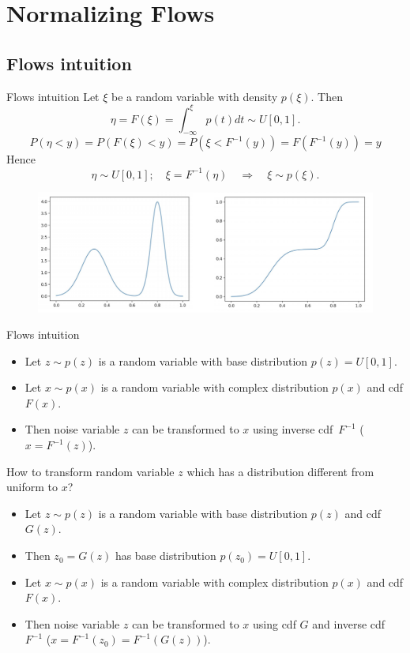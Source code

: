 \section{Normalizing Flows}
\subsection{Flows intuition}
\begin{frame}{Flows intuition}
	Let $\xi$ be a random variable with density $p(\xi)$. Then
	\[
	\eta = F(\xi) = \int_{-\infty}^\xi p(t)dt \sim U[0, 1].
	\]
	\[
	P(\eta < y) = P(F(\xi) < y) = P(\xi < F^{-1}(y)) = F(F^{-1}(y)) = y
	\]
	Hence
	\[
	\eta \sim U[0, 1]; \quad \xi = F^{-1}(\eta) \quad \Rightarrow \quad \xi \sim p(\xi).
	\]
	\begin{figure}
		\includegraphics[width=\linewidth]{figs/flows_1d}
	\end{figure}
	
\end{frame}
\begin{frame}{Flows intuition}
	\begin{itemize}
		\item Let $z \sim p(z)$ is a random variable with base distribution $p(z) = U[0, 1]$. 
		\item Let $x \sim p(x)$ is a random variable with complex distribution $p(x)$ and cdf $F(x)$. 
		\item Then noise variable $z$ can be transformed to $x$ using inverse cdf~$F^{-1}$ ($x = F^{-1}(z)$).
	\end{itemize}
	How to transform random variable $z$  which has a distribution different from uniform to $x$?
	\begin{itemize}
		\item Let $z \sim p(z)$ is a random variable with base distribution $p(z)$ and cdf $G(z)$.
		\item Then $z_0 = G(z)$ has base distribution $p(z_0) = U[0, 1]$.
		\item Let $x \sim p(x)$ is a random variable with complex distribution $p(x)$ and cdf $F(x)$. 
		\item Then noise variable $z$ can be transformed to $x$ using cdf $G$ and inverse cdf~$F^{-1}$ ($x = F^{-1}(z_0) = F^{-1}(G(z))$).
	\end{itemize}
\end{frame}
